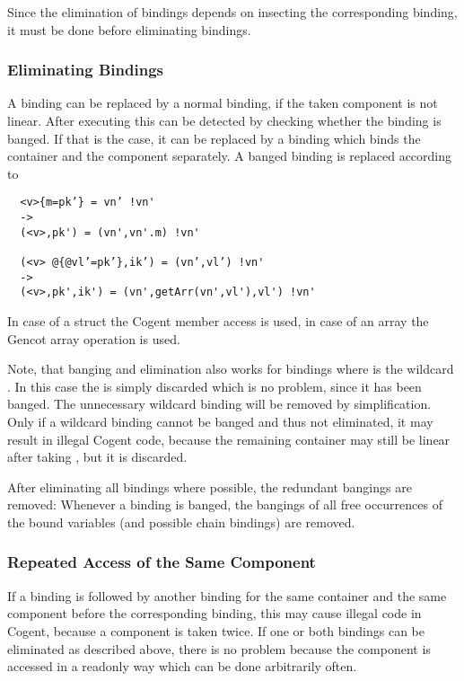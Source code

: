 Since the elimination of  bindings depends on insecting the corresponding  binding, it must be done before 
eliminating  bindings.

\subsubsection{Eliminating  Bindings}

A  binding can be replaced by a normal binding, if the taken component is not linear. After executing 
this can be detected by checking whether the  binding is banged. If that is the case, it can be replaced by a binding
which binds the container and the component separately. A banged  binding is replaced according to
\begin{verbatim}
  <v>{m=pk’} = vn’ !vn'
  ->
  (<v>,pk') = (vn',vn'.m) !vn'

  (<v> @{@vl’=pk’},ik’) = (vn’,vl’) !vn'
  ->
  (<v>,pk',ik') = (vn',getArr(vn',vl'),vl') !vn'
\end{verbatim}
In case of a struct the Cogent member access  is used, in case of an array the Gencot array operation 
is used.

Note, that banging and elimination also works for  bindings where  is the wildcard \code{\_}. In this case the 
 is simply discarded which is no problem, since it has been banged. The unnecessary wildcard binding will be removed by
 simplification. Only if a wildcard  binding cannot be banged and thus not eliminated, it may result in illegal
Cogent code, because the remaining container may still be linear after taking , but it is discarded.

After eliminating all  bindings where possible, the redundant bangings are removed: Whenever a binding is banged, 
the bangings of all free occurrences of the bound variables (and possible chain bindings) are removed. 

\subsubsection{Repeated Access of the Same Component}

If a  binding is followed by another  binding for the same container and the same component before the 
corresponding  binding, this may cause illegal code in Cogent, because a component is taken twice. If one or both 
 bindings can be eliminated as described above, there is no problem because the component is accessed in a readonly 
way which can be done arbitrarily often.

